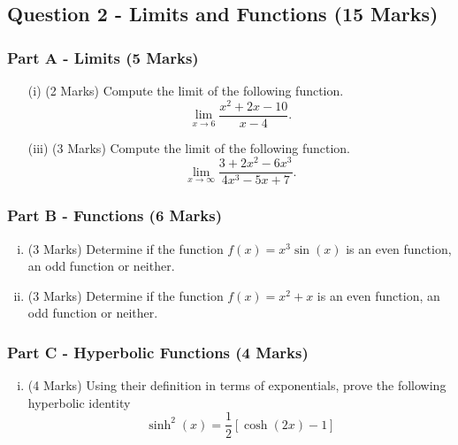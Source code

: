 \documentclass[a4paper,12pt]{article}
\begin{document}
\bigskip
\subsection*{Question 2 - Limits and Functions (15 Marks)}
\subsubsection*{Part A - Limits (5 Marks)}
\begin{enumerate}
	\item[(i)] (2 Marks)  Compute the limit of the following function.
		{
			\large
	\[\lim_{x \to 6 } \frac{x^2 + 2x-10}{x-4}.\]
}
	\bigskip
	
	\item[(iii)] (3 Marks) Compute the limit of the following function.
		{
			\large
	\[ \lim_{x \to \infty } \frac{3 + 2x^2 - 6x^3 }{4x^3 - 5x + 7}. \]	
}
\end{enumerate}
\medskip
\subsubsection*{Part B - Functions (6 Marks)}
\begin{enumerate}[(i)]
	\item (3 Marks) Determine if the function $f(x) = x^3\sin(x)$ is an even function, an odd function or neither.
	\bigskip
		\item (3 Marks) Determine if the function $f(x) = x^2+x$ is an even function, an odd function or neither.
		\bigskip
\end{enumerate}
\medskip
\subsubsection*{Part C - Hyperbolic Functions (4 Marks)}


\begin{enumerate}[(i)]
	\item (4 Marks) Using their definition in terms of exponentials, prove the following hyperbolic identity   
	{
		\large
	\[\sinh^2 (x) = \frac{1}{2}\left[\cosh(2x)-1\right]\]
}
	
\end{enumerate}
\end{document}
